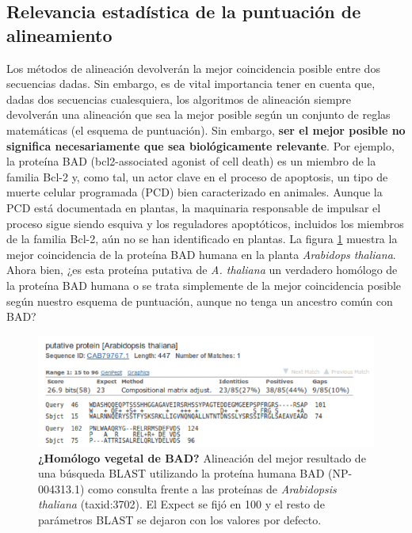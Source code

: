 \subsection{Relevancia estadística de la puntuación de alineamiento}
Los métodos de alineación devolverán la mejor coincidencia posible entre dos secuencias dadas. Sin embargo, es de vital importancia tener en cuenta que, dadas dos secuencias cualesquiera, los algoritmos de alineación siempre devolverán una alineación que sea la mejor posible según un conjunto de reglas matemáticas (el esquema de puntuación). Sin embargo, \textbf{ser el mejor posible no significa necesariamente que sea biológicamente relevante}. Por ejemplo, la proteína BAD (bcl2-associated agonist of cell death) es un miembro de la familia Bcl-2 y, como tal, un actor clave en el proceso de apoptosis, un tipo de muerte celular programada (PCD) bien caracterizado en animales. Aunque la PCD está documentada en plantas, la maquinaria responsable de impulsar el proceso sigue siendo esquiva y los reguladores apoptóticos, incluidos los miembros de la familia Bcl-2, aún no se han identificado en plantas. La figura \ref{fig:bad-thaliana} muestra la mejor coincidencia de la proteína BAD humana en la planta \textit{Arabidops thaliana}. Ahora bien, ¿es esta proteína putativa de \textit{A. thaliana} un verdadero homólogo de la proteína BAD humana o se trata simplemente de la mejor coincidencia posible según nuestro esquema de puntuación, aunque no tenga un ancestro común con BAD? 

\begin{figure}[htbp]
\centering
\includegraphics[width = \textwidth]{figs/bad-thaliana.png}
\caption{\textbf{¿Homólogo vegetal de BAD?} Alineación del mejor resultado de una búsqueda BLAST utilizando la proteína humana BAD (NP-004313.1) como consulta frente a las proteínas de \textit{Arabidopsis thaliana} (taxid:3702). El Expect se fijó en 100 y el resto de parámetros BLAST se dejaron con los valores por defecto.}
\label{fig:bad-thaliana}
\end{figure}

